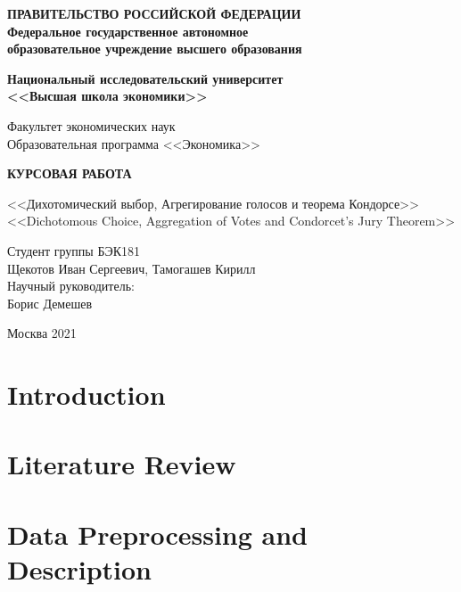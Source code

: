 \documentclass[a4paper,10pt]{extarticle}
\begin{document}
\thispagestyle{empty}
\begin{center}
	\textbf{ПРАВИТЕЛЬСТВО РОССИЙСКОЙ ФЕДЕРАЦИИ}\\
	\vspace{3ex}
	\textbf{Федеральное государственное автономное\\ образовательное учреждение высшего образования}

	\vspace{3ex}

	\textbf{Национальный исследовательский университет \\ <<Высшая школа экономики>>}

	\vspace{10ex}
	\begin{flushright}
		Факультет экономических наук\\
		Образовательная программа <<Экономика>>
		\end{flushright}
\end{center}
\vspace{12ex}

\begin{center}
	{\textbf{КУРСОВАЯ РАБОТА
	}}
	\vspace{1ex}

	<<Дихотомический выбор, Агрегирование голосов и теорема Кондорсе>> \\
	<<Dichotomous Choice, Aggregation of Votes and Condorcet's Jury Theorem>>
\end{center}
\vspace{4ex}
\begin{flushright}
	\noindent
	Студент группы БЭК181\\Щекотов Иван Сергеевич, Тамогашев Кирилл\\
	\vspace{13ex}
	Научный руководитель:\\
	Борис Демешев

\end{flushright}

\vfill

\begin{center}
	Москва 2021

\end{center}
\newpage
\tableofcontents
\newpage
\section{Introduction}
%
\section{Literature Review}
\section{Data Preprocessing and Description}

%
\cleardoublepage
{}
{}

\end{document}
